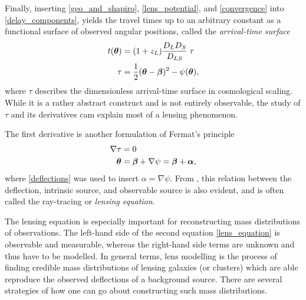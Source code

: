 Finally, inserting \eqref{geo_and_shapiro}, \eqref*{lens_potential}, and
\eqref*{convergence} into \eqref{delay_components}, yields the travel times up
to an arbitrary constant as a functional surface of observed angular positions,
called the \textit{arrival-time surface}
%
%
\begin{equation}\eqlbl{arriva_time_surface}%
  \begin{aligned}%
    t(\bm\theta) &= (1+z_{L})\frac{D_{L}D_{S}}{D_{LS}}\;\tau \\
    \tau &= \frac{1}{2}(\bm\theta-\bm\beta)^{2} - \psi(\bm\theta),
  \end{aligned}%
\end{equation}%
%
where $\tau$ describes the dimensionless arrival-time surface in cosmological
scaling. While it is a rather abstract construct and is not entirely observable, the study of
$\tau$ and its derivatives cam explain most of a lensing phenomenon.

The first derivative is another formulation of Fermat's principle
%
\begin{equation}\eqlbl{lens_equation}%
  \begin{aligned}%
    \nabla\tau &= 0 \\
    \bm\theta &= \bm\beta + \nabla\psi = \bm\beta + \bm\alpha,
  \end{aligned}%
\end{equation}%
%
where \eqref{deflections} was used to insert $\alpha = \nabla\psi$.  From
, this relation between the deflection, intrinsic source, and
observable source is also evident, and is often called the ray-tracing or
\textit{lensing equation}. 

The lensing equation is especially important for reconstructing mass
distributions of observations.  The left-hand side of the second equation
\eqref*{lens_equation} is observable and measurable, whereas the right-hand side
terms are unknown and thus have to be modelled.  In general terms, lens
modelling is the process of finding credible mass distributions of lensing
galaxies (or clusters) which are able reproduce the observed deflections of a
background source.  There are several strategies of how one can go about
constructing such mass distributions.  

